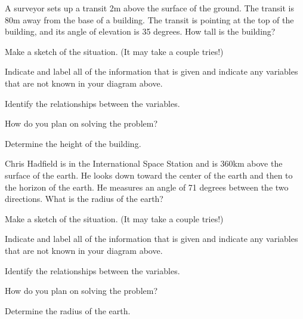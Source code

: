 \begin{problem}
\item A surveyor sets up a transit 2m above the surface of the
  ground. The transit is 80m away from the base of a building.
  The transit is pointing at the top of the building,
  and its angle of elevation is 35 degrees. How tall is the building?
  \begin{subproblem}
  \item Make a sketch of the situation. (It may take a couple tries!)
    \vfill
    \vfill
  \item Indicate and label all of the information that is given and
    indicate any variables that are not known in your diagram above.
  \item Identify the relationships between the variables.
    \vfill
    \vfill
  \item How do you plan on solving the problem?
    \vfill
  \item Determine the height of the building.
    \vfill
    \vfill
  \end{subproblem}

\clearpage

\item Chris Hadfield is in the International Space Station and is
  360km above the surface of the earth. He looks down toward the
  center of the earth and then to the horizon of the earth. He
  measures an angle of 71 degrees between the two directions. What is
  the radius of the earth?
  \begin{subproblem}
  \item Make a sketch of the situation. (It may take a couple tries!)
    \vfill
    \vfill
  \item Indicate and label all of the information that is given and
    indicate any variables that are not known in your diagram above.
  \item Identify the relationships between the variables.
    \vfill
    \vfill
  \item How do you plan on solving the problem?
    \vfill
  \item Determine the radius of the earth.
    \vfill
    \vfill
  \end{subproblem}

\end{problem}

\postClass

